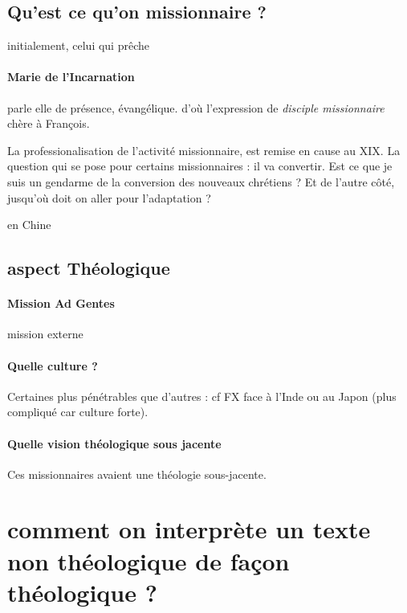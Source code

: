 \subsection{Qu'est ce qu'on missionnaire ?}

\begin{Def}[Missionnaire]
    initialement, celui qui prêche
\end{Def}

\paragraph{Marie de l'Incarnation} parle elle de présence, évangélique. 
d'où l'expression de \textit{disciple missionnaire} chère à François.

La professionalisation de l'activité missionnaire, est remise en cause au XIX. 
La question qui se pose pour certains missionnaires : il va convertir. Est ce que je suis un gendarme de la conversion des nouveaux chrétiens ? 
Et de l'autre côté, jusqu'où doit on aller pour l'adaptation ?
\begin{Ex}
en Chine    
\end{Ex}


\subsection{aspect Théologique}

\paragraph{Mission Ad Gentes} mission externe

\paragraph{Quelle culture ?} Certaines plus pénétrables que d'autres : cf FX face à l'Inde ou au Japon (plus compliqué car culture forte).

\paragraph{Quelle vision théologique sous jacente} Ces missionnaires avaient une théologie sous-jacente. 


\section{comment on interprète un texte non théologique de façon théologique ?}

